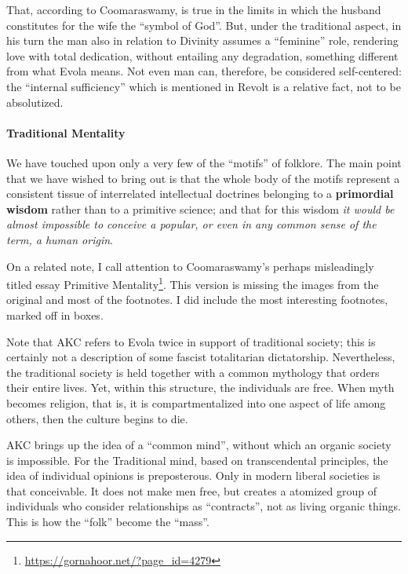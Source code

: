 \begin{quotex}
That, according to Coomaraswamy, is true in the limits in which the husband constitutes for the wife the ``symbol of God''. But, under the traditional aspect, in his turn the man also in relation to Divinity assumes a ``feminine'' role, rendering love with total dedication, without entailing any degradation, something different from what Evola means. Not even man can, therefore, be considered self-centered: the ``internal sufficiency'' which is mentioned in Revolt is a relative fact, not to be absolutized.
\end{quotex}

\paragraph{Traditional Mentality}

\begin{quotex}
We have touched upon only a very few of the ``motifs'' of folklore. The main point that we have wished to bring out is that the whole body of the motifs represent a consistent tissue of interrelated intellectual doctrines belonging to a \textbf{primordial wisdom} rather than to a primitive science; and that for this wisdom \emph{it would be almost impossible to conceive a popular, or even in any common sense of the term, a human origin}.
\end{quotex}


On a related note, I call attention to Coomaraswamy's perhaps misleadingly titled essay Primitive Mentality\footnote{\url{https://gornahoor.net/?page_id=4279}}. This version is missing the images from the original and most of the footnotes. I did include the most interesting footnotes, marked off in boxes.

Note that AKC refers to Evola twice in support of traditional society; this is certainly not a description of some fascist totalitarian dictatorship. Nevertheless, the traditional society is held together with a common mythology that orders their entire lives. Yet, within this structure, the individuals are free. When myth becomes religion, that is, it is compartmentalized into one aspect of life among others, then the culture begins to die.

AKC brings up the idea of a ``common mind'', without which an organic society is impossible. For the Traditional mind, based on transcendental principles, the idea of individual opinions is preposterous. Only in modern liberal societies is that conceivable. It does not make men free, but creates a atomized group of individuals who consider relationships as ``contracts'', not as living organic things. This is how the ``folk'' become the ``mass''.



